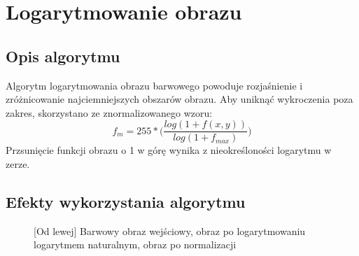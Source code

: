 \documentclass[a4paper,12pt, titlepage]{report}
\begin{document}
\section{Logarytmowanie obrazu}
\subsection*{Opis algorytmu}
\par Algorytm logarytmowania obrazu barwowego powoduje rozjaśnienie i zróżnicowanie najciemniejszych obszarów obrazu. Aby uniknąć wykroczenia poza zakres, skorzystano ze znormalizowanego wzoru: \[f_{m}=255*\Big(\frac{log(1+f(x,y))}{log(1+f_{max})}\Big)\]Przsunięcie funkcji obrazu o 1 w górę wynika z nieokreśloności logarytmu w zerze.
\subsection*{Efekty wykorzystania algorytmu}
\begin{figure}[h]
    \centering
    \caption{[Od lewej] Barwowy obraz wejściowy, obraz po logarytmowaniu logarytmem naturalnym, obraz po normalizacji}%
    \label{fig:geo_after_grey1}%
\end{figure}
\end{document}

